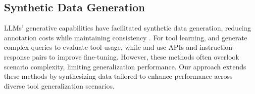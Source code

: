 \subsection{Synthetic Data Generation}
LLMs' generative capabilities have facilitated synthetic data generation, reducing annotation costs while maintaining consistency \cite{zelikman2022star, honovich-etal-2023-unnatural}. For tool learning, \citet{huang-etal-2024-planning-creation} and \citet{huang2024metatool} generate complex queries to evaluate tool usage, while \citet{qin2024toolllm} and \citet{tang2023toolalpaca} use APIs and instruction-response pairs to improve fine-tuning. However, these methods often overlook scenario complexity, limiting generalization performance. Our approach extends these methods by synthesizing data tailored to enhance performance across diverse tool generalization scenarios.



